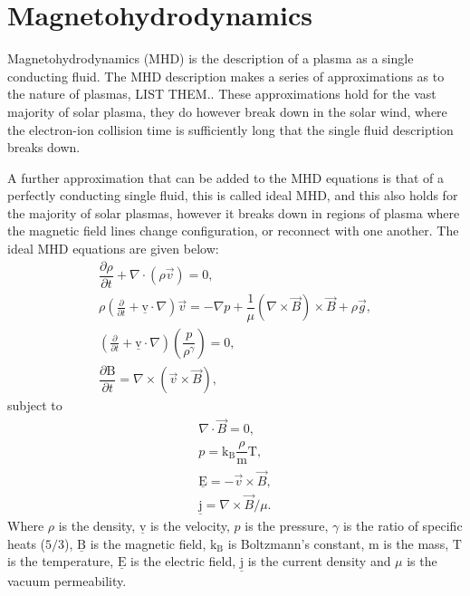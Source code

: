 \section{Magnetohydrodynamics}\label{sec:MHD}

Magnetohydrodynamics (MHD) is the description of a plasma as a single conducting fluid.
The MHD description makes a series of approximations as to the nature of plasmas, LIST THEM..
These approximations hold for the vast majority of solar plasma, they do however break down in the solar wind, where the electron-ion collision time is sufficiently long that the single fluid description breaks down.

A further approximation that can be added to the MHD equations is that of a perfectly conducting single fluid, this is called ideal MHD, and this also holds for the majority of solar plasmas, however it breaks down in regions of plasma where the magnetic field lines change configuration, or reconnect with one another.
The ideal MHD equations are given below:
\newcommand{\condev}{\left(\frac{\partial}{\partial t} + \underline{\mathrm{v}}\cdot\nabla\right)}
\begin{align}                                                         
    \dfrac{\partial \rho }{\partial t} + \nabla \cdot (\rho \vec{v}) =       
    0,
    \tag{Mass Conservation}\\
    \rho  \condev\vec{v} =
    -\nabla p + \dfrac{1}{\mu}(\nabla \times \vec{B}) \times \vec{B} + \rho \vec{g},
    \tag{Equation of Motion}\\
    \condev \left(\dfrac{p}{\rho^\gamma} \right)  = 0,
    \tag{Energy Equation}\\
    \dfrac{\partial \mathrm{B}}{\partial t} = \nabla \times (\vec{v} \times \vec{B}),
    \tag{Induction Equation}               
\end{align}
subject to
\begin{align}
    \nabla \cdot \vec{B} = 0,
    \tag{Solenoid Equation}\\
    p = \mathrm{k_B} \dfrac{\rho}{\mathrm{m}} \mathrm{T},
    \tag{Ideal Gas Law}\\
    \underline{\mathrm{E}} = - \vec{v} \times \vec{B},
    \tag{Ohm's Law}\\
    \underline{\mathrm{j}} = \nabla \times \vec{B}/ \mu.
    \tag{Electric Current}                          
\end{align}
Where $\rho$ is the density, $\underline{\mathrm{v}}$ is the velocity, $p$ is the pressure, $\gamma$ is the ratio of specific heats ($5/3$), $\underline{\mathrm{B}}$ is the magnetic field, $\mathrm{k_B}$ is Boltzmann's constant, $\mathrm{m}$ is the mass, $\mathrm{T}$ is the temperature, $\underline{\mathrm{E}}$ is the electric field, $\underline{\mathrm{j}}$ is the current density and $\mu$ is the vacuum permeability. 


